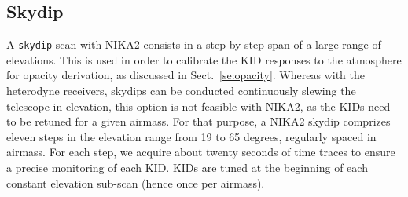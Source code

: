 


\subsection{Skydip}
\label{se:skydip}

A {\tt skydip} scan with NIKA2 consists in a step-by-step span
of a large range of elevations. This is used in order to calibrate the
KID responses to the atmosphere for opacity derivation, as discussed in
Sect.~\ref{se:opacity}.
Whereas with the heterodyne receivers, skydips can be
conducted continuously slewing the telescope in elevation, this
option is not feasible with NIKA2, as the KIDs need to be retuned
for a given airmass.
For that purpose, a NIKA2 skydip comprizes eleven steps in
the elevation range from 19 to 65 degrees, regularly spaced in
airmass. For each step, we acquire about twenty seconds of time traces
to ensure a precise monitoring of each KID. KIDs are tuned at the beginning of
each constant elevation sub-scan (hence once per airmass).
%

